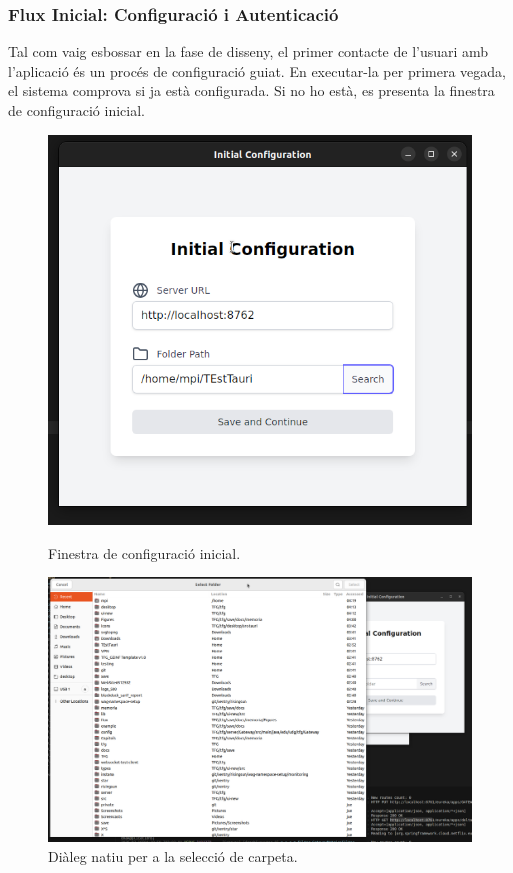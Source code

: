 \subsubsection{Flux Inicial: Configuració i Autenticació}
Tal com vaig esbossar en la fase de disseny, el primer contacte de l'usuari amb l'aplicació és un procés de configuració guiat. En executar-la per primera vegada, el sistema comprova si ja està configurada. Si no ho està, es presenta la finestra de configuració inicial.

\begin{figure}[H]
    \centering
    \begin{minipage}{0.48\textwidth}
        \centering
        \includegraphics[width=\linewidth]{Figures/ui-desktop/initial_config.png}
        \caption{Finestra de configuració inicial.}
        \label{fig:desktop-initial-config-impl}
    \end{minipage}\hfill
    \begin{minipage}{0.48\textwidth}
        \centering
        \includegraphics[width=\linewidth]{Figures/ui-desktop/initial_config_select_folder.png}
        \caption{Diàleg natiu per a la selecció de carpeta.}
        \label{fig:desktop-initial-config-select-impl}
    \end{minipage}
\end{figure}

